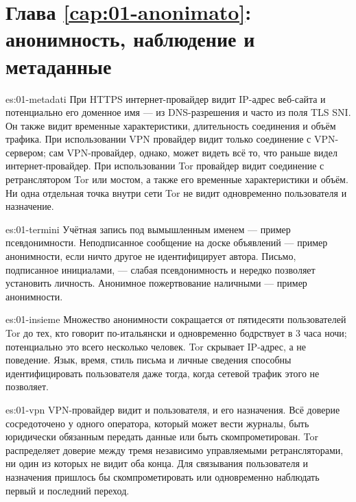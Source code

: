 \section*{Глава \ref{cap:01-anonimato}: анонимность, наблюдение и метаданные}

\begin{soluzione}{es:01-metadati}
При HTTPS интернет-провайдер видит IP-адрес веб-сайта и потенциально его доменное имя — из DNS-разрешения и часто из поля TLS SNI. Он также видит временные характеристики, длительность соединения и объём трафика. При использовании VPN провайдер видит только соединение с VPN-сервером; сам VPN-провайдер, однако, может видеть всё то, что раньше видел интернет-провайдер. При использовании Tor провайдер видит соединение с ретранслятором Tor или мостом, а также его временные характеристики и объём. Ни одна отдельная точка внутри сети Tor не видит одновременно пользователя и назначение.
\end{soluzione}

\begin{soluzione}{es:01-termini}
Учётная запись под вымышленным именем — пример псевдонимности. Неподписанное сообщение на доске объявлений — пример анонимности, если ничто другое не идентифицирует автора. Письмо, подписанное инициалами, — слабая псевдонимность и нередко позволяет установить личность. Анонимное пожертвование наличными — пример анонимности.
\end{soluzione}

\begin{soluzione}{es:01-insieme}
Множество анонимности сокращается от пятидесяти пользователей Tor до тех, кто говорит по-итальянски и одновременно бодрствует в 3 часа ночи; потенциально это всего несколько человек. Tor скрывает IP-адрес, а не поведение. Язык, время, стиль письма и личные сведения способны идентифицировать пользователя даже тогда, когда сетевой трафик этого не позволяет.
\end{soluzione}

\begin{soluzione}{es:01-vpn}
VPN-провайдер видит и пользователя, и его назначения. Всё доверие сосредоточено у одного оператора, который может вести журналы, быть юридически обязанным передать данные или быть скомпрометирован. Tor распределяет доверие между тремя независимо управляемыми ретрансляторами, ни один из которых не видит оба конца. Для связывания пользователя и назначения пришлось бы скомпрометировать или одновременно наблюдать первый и последний переход.
\end{soluzione}

